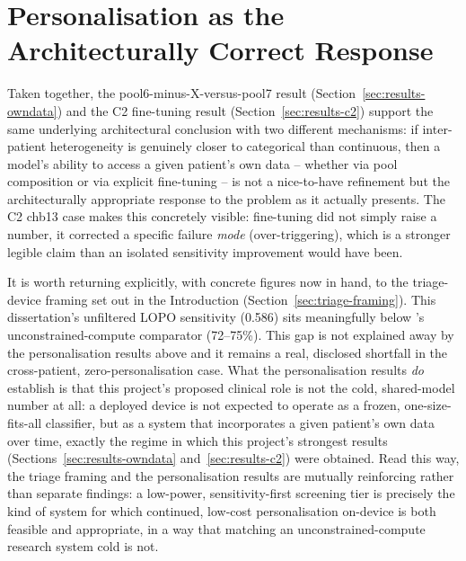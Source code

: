 
\section{Personalisation as the Architecturally Correct Response}

Taken together, the pool6-minus-X-versus-pool7 result (Section~\ref{sec:results-owndata}) and the C2 fine-tuning result (Section~\ref{sec:results-c2}) support the same underlying 
architectural conclusion with two different mechanisms: if inter-patient heterogeneity is genuinely closer to categorical than continuous, then a model's ability to access a given 
patient's own data -- whether via pool composition or via explicit fine-tuning -- is not a nice-to-have refinement but the architecturally appropriate response to the problem as it 
actually presents. The C2 chb13 case makes this concretely visible: fine-tuning did not simply raise a number, it corrected a specific failure \emph{mode} (over-triggering), which is a 
stronger legible claim than an isolated sensitivity improvement would have been.

It is worth returning explicitly, with concrete figures now in hand, to the triage-device framing set out in the Introduction (Section~\ref{sec:triage-framing}). This dissertation's 
unfiltered LOPO sensitivity (0.586) sits meaningfully below \citet{ali2024}'s unconstrained-compute comparator (72--75\%).  This gap is not explained away by the 
personalisation results above and it remains a real, disclosed shortfall in the cross-patient, zero-personalisation case. What the personalisation results \emph{do} establish is that this project's proposed clinical role is not the cold, shared-model number at all: a deployed device is not expected to operate as a frozen, one-size-fits-all classifier, but as a system that incorporates a given patient's own data over time, exactly the regime in which this project's strongest results (Sections~\ref{sec:results-owndata} and~\ref{sec:results-c2}) were obtained. Read this way, the triage framing and the personalisation results are mutually reinforcing rather than separate findings: a low-power, sensitivity-first screening tier is precisely the kind of system for which continued, low-cost personalisation on-device is both feasible and appropriate, in a way that matching an unconstrained-compute research system cold is not.


